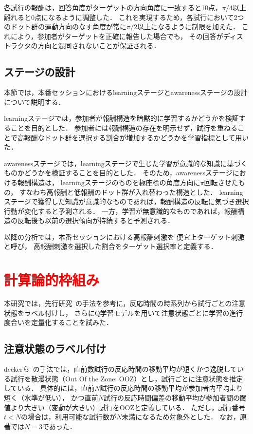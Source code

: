 \documentclass[dvipdfmx]{jsarticle}
\begin{document}
各試行の報酬は，回答角度がターゲットの方向角度に一致すると10点，$\pi/4$以上離れると0点になるように調整した．
これを実現するため，各試行において2つのドット群の運動方向のなす角度が常に$\pi/2$以上になるように制限を加えた．
これにより，参加者がターゲットを正確に報告した場合でも，
その回答がディストラクタの方向と混同されないことが保証される．

\subsection{ステージの設計}
本節では，本番セッションにおけるlearningステージとawarenessステージの設計について説明する．

learningステージでは，参加者が報酬構造を暗黙的に学習するかどうかを検証することを目的とした．
参加者には報酬構造の存在を明示せず，試行を重ねることで高報酬なドット群を選択する割合が増加するかどうかを学習指標として用いた．

awarenessステージでは，learningステージで生じた学習が意識的な知識に基づくものかどうかを検証することを目的とした．
そのため，awarenessステージにおける報酬構造は，
learningステージのものを極座標の角度方向に$\pi$回転させたもの，
すなわち高報酬と低報酬のドット群が入れ替わった構造とした．
learningステージで獲得した知識が意識的なものであれば，報酬構造の反転に気づき選択行動が変化すると予測される．
一方，学習が無意識的なものであれば，報酬構造の反転後も以前の選択傾向が持続すると予測される．

以降の分析では，本番セッションにおける高報酬刺激を
便宜上ターゲット刺激と呼び，
高報酬刺激を選択した割合をターゲット選択率と定義する．


\section{\textcolor{red}{計算論的枠組み}}
本研究では，先行研究~\cite{decker2023pay}の手法を参考に，反応時間の時系列から試行ごとの注意状態をラベル付けし，
さらにQ学習モデルを用いて注意状態ごとに学習の進行度合いを定量化することを試みた．

\subsection{注意状態のラベル付け}\label{sec:attention_labeling}
deckerら~\cite{decker2023pay}の手法では，直前数試行の反応時間の移動平均が短くかつ逸脱している試行を散漫状態（Out Of the Zone: OOZ）とし，試行ごとに注意状態を推定している．
具体的には，直前$N$試行の反応時間の移動平均が参加者内平均より短く（水準が低い），
かつ直前$N$試行の反応時間偏差の移動平均が参加者間の閾値より大きい（変動が大きい）試行をOOZと定義している．
ただし，試行番号$t<N$の場合は，利用可能な試行数が$N$未満になるため対象外とした．
なお，原著では$N=3$であった．
\end{document}
